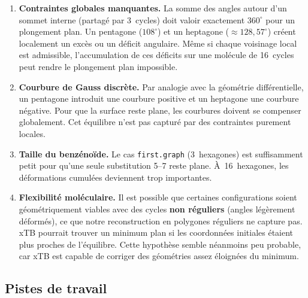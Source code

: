 \documentclass[12pt,a4paper]{article}
\theoremstyle{definition}
\theoremstyle{remark}
\begin{document}
\begin{enumerate}
  \item \textbf{Contraintes globales manquantes.} La somme des angles
        autour d'un sommet interne (partag\'e par 3~cycles) doit valoir
        exactement $360^\circ$ pour un plongement plan. Un pentagone
        ($108^\circ$) et un heptagone ($\approx 128{,}57^\circ$) cr\'eent
        localement un exc\`es ou un d\'eficit angulaire. M\^eme si chaque
        voisinage local est admissible, l'accumulation de ces d\'eficits
        sur une mol\'ecule de 16~cycles peut rendre le plongement plan
        impossible.

  \item \textbf{Courbure de Gauss discr\`ete.} Par analogie avec la
        g\'eom\'etrie diff\'erentielle, un pentagone introduit une
        courbure positive et un heptagone une courbure n\'egative.
        Pour que la surface reste plane, les courbures doivent se
        compenser globalement. Cet \'equilibre n'est pas captur\'e par
        des contraintes purement locales.

  \item \textbf{Taille du benz\'eno\"ide.} Le cas \texttt{first.graph}
        (3~hexagones) est suffisamment petit pour qu'une seule
        substitution 5--7 reste plane. \`A~16~hexagones, les d\'eformations
        cumul\'ees deviennent trop importantes.

  \item \textbf{Flexibilit\'e mol\'eculaire.} Il est possible que
        certaines configurations soient g\'eom\'etriquement viables avec
        des cycles \textbf{non r\'eguliers} (angles l\'eg\`erement
        d\'eform\'es), ce que notre reconstruction en polygones r\'eguliers
        ne capture pas.  xTB pourrait trouver un minimum plan si les
        coordonn\'ees initiales \'etaient plus proches de l'\'equilibre.
        Cette hypoth\`ese semble n\'eanmoins peu probable, car xTB est
        capable de corriger des g\'eom\'etries assez \'eloign\'ees du
        minimum.
\end{enumerate}

\subsection{Pistes de travail}
\end{document}
